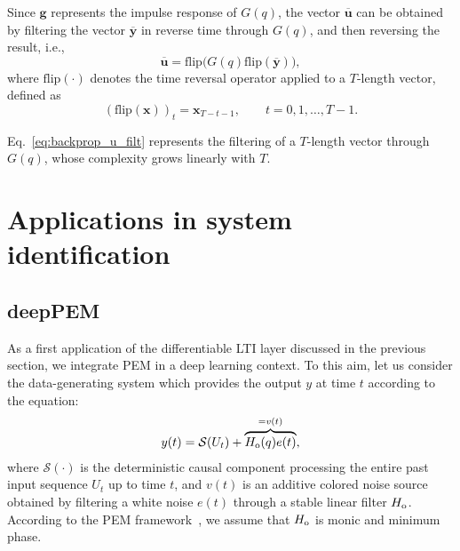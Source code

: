\documentclass{article}
\newcommand{\q}{q} %
\newcommand{\adjoint}[1]{\overline{#1}}
\newcommand{\tvec}[1]{\mathbf{#1}}
\newcommand{\nsamp}{T}
\begin{document}
Since $\tvec{g}$ represents the impulse response of  $G(q)$, the vector $\adjoint{\tvec{u}}$ can be obtained  by filtering the vector $\adjoint{\tvec{y}}$ in reverse time through $G(q)$, and then reversing the result, i.e., 
\begin{equation}
\label{eq:backprop_u_filt}
{\adjoint{\tvec{u}}} = \textrm{flip}\big(G(q)\textrm{flip}(\adjoint{\tvec{y}})\big),
\end{equation}
where $\textrm{flip}(\cdot)$ denotes the time reversal operator applied to a $\nsamp$-length vector, defined as
\begin{equation}
\left(\textrm{flip}(\tvec{x})\right)_t = \tvec{x}_{\nsamp-t-1},\qquad t=0,1,\dots,\nsamp-1. 
\end{equation}


Eq.~\eqref{eq:backprop_u_filt} represents the filtering of a $\nsamp$-length vector through $G(\q)$, whose  complexity grows  linearly with  $\nsamp$. 


 
\section{Applications in system identification}

\subsection{deepPEM} 
\label{sec:pem}
As a first application of the differentiable LTI layer discussed in the previous section, we  integrate PEM in a deep learning context. To this aim, let us consider the data-generating system   which provides the output $y$ at time $t$ according to the equation:
\begin{align}
\label{eq:truesys_PEM}
y(t) = \mathcal{S}(U_t) + \overbrace{H_{\rm o}(q) e(t)}^{=v(t)},
\end{align}
where $\mathcal{S}(\cdot)$ is the deterministic causal component processing the entire past input sequence $U_t$ up to time $t$, and $v(t)$ is an additive
colored noise source obtained by filtering a white noise $e(t)$ through a stable linear filter 
$H_{\rm o}$. According to the PEM framework~\cite[Ch. 2.3]{ljung:1999system}, we assume that $H_{\rm o}$ is monic  and minimum phase.


\end{document}
